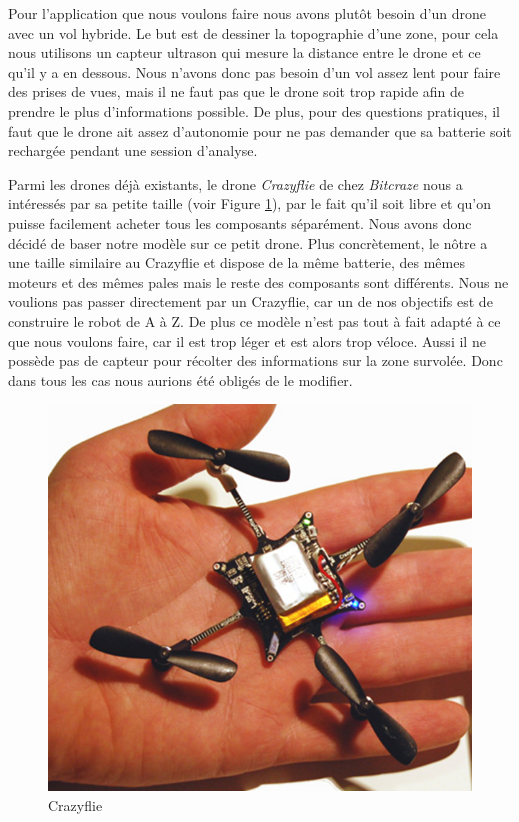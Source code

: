 \documentclass[a4paper,10pt]{report}
\begin{document}
    Pour l'application que nous voulons faire nous avons plutôt besoin d'un 
drone avec un vol hybride. Le but est de dessiner la topographie d'une zone, 
pour cela nous utilisons un capteur ultrason qui mesure la distance entre le 
drone et ce qu'il y a en dessous. Nous n'avons donc pas besoin d'un vol assez 
lent pour faire des prises de vues, mais il ne faut pas que le drone soit trop 
rapide afin de prendre le plus d'informations possible. De plus, pour des 
questions pratiques, il faut que le drone ait assez d'autonomie pour ne pas 
demander que sa batterie soit rechargée pendant une session d'analyse.
    
    Parmi les drones déjà existants, le drone \textit{Crazyflie} de chez 
\textit{Bitcraze}\cite{bitcraze} nous a intéressés par sa petite taille (voir 
Figure \ref{crazyflie}), par le fait qu'il soit libre et qu'on puisse facilement 
acheter tous les composants séparément. Nous avons donc décidé de baser notre 
modèle sur ce petit drone. Plus concrètement, le nôtre a une taille similaire 
au Crazyflie et dispose de la même batterie, des mêmes moteurs et des mêmes 
pales mais le reste des composants sont différents. Nous ne voulions pas passer 
directement par un Crazyflie, car un de nos objectifs est de construire le robot 
de A à Z. De plus ce modèle n'est pas tout à fait adapté à ce que nous voulons 
faire, car il est trop léger et est alors trop véloce. Aussi il ne possède 
pas de capteur pour récolter des informations sur la zone survolée. Donc dans 
tous les cas nous aurions été obligés de le modifier.
    
    \begin{figure}[htbp]%
      \centering
      \includegraphics[scale = 0.25]{img/crazyflie.png}
      \caption{Crazyflie}
      \label{crazyflie}
    \end{figure}
    
\end{document}
